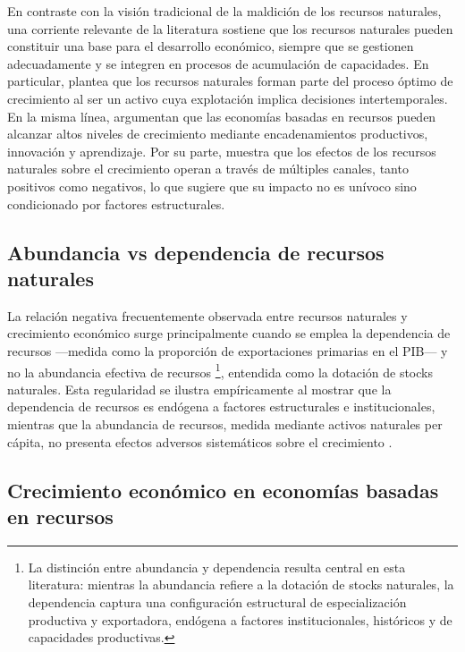 \documentclass[../../PTFM.tex]{subfiles}
\begin{document}
	En contraste con la visión tradicional de la maldición de los recursos naturales, una corriente relevante de la literatura sostiene que los recursos naturales pueden constituir una base para el desarrollo económico, siempre que se gestionen adecuadamente y se integren en procesos de acumulación de capacidades. En particular, \textcite{Stiglitz1974} plantea que los recursos naturales forman parte del proceso óptimo de crecimiento al ser un activo cuya explotación implica decisiones intertemporales. En la misma línea, \textcite{DeFerranti2002} argumentan que las economías basadas en recursos pueden alcanzar altos niveles de crecimiento mediante encadenamientos productivos, innovación y aprendizaje. Por su parte, \textcite{Stijns2005} muestra que los efectos de los recursos naturales sobre el crecimiento operan a través de múltiples canales, tanto positivos como negativos, lo que sugiere que su impacto no es unívoco sino condicionado por factores estructurales.
	
	\subsection{Abundancia vs dependencia de recursos naturales}
	\label{subsec:abundancia-vs-dependencia}
	
	La relación negativa frecuentemente observada entre recursos naturales y crecimiento económico surge principalmente cuando se emplea la dependencia de recursos —medida como la proporción de exportaciones primarias en el PIB— y no la abundancia efectiva de recursos \footnote{La distinción entre abundancia y dependencia resulta central en esta literatura: mientras la abundancia refiere a la dotación de stocks naturales, la dependencia captura una configuración estructural de especialización productiva y exportadora, endógena a factores institucionales, históricos y de capacidades productivas.}, entendida como la dotación de stocks naturales. Esta regularidad se ilustra empíricamente al mostrar que la dependencia de recursos es endógena a factores estructurales e institucionales, mientras que la abundancia de recursos, medida mediante activos naturales per cápita, no presenta efectos adversos sistemáticos sobre el crecimiento \parencite{Brunnschweiler2008}.
	
	\subsection{Crecimiento económico en economías basadas en recursos}
	\label{subsec:crecimiento-economico}
	
\end{document}
